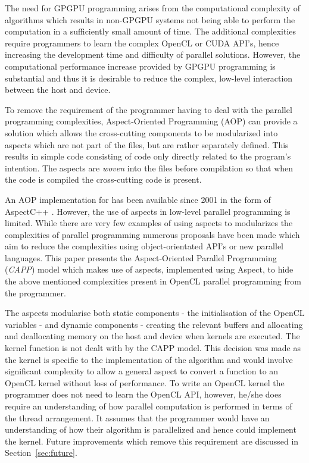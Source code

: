 \documentclass{sig-alternate-05-2015}
\begin{document}
The need for GPGPU programming arises from the computational complexity of
algorithms which results in non-GPGPU systems not being able to perform the
computation in a sufficiently small amount of time. The additional complexities
require programmers to learn the complex OpenCL or CUDA API's, hence increasing
the development time and difficulty of parallel solutions. However, the computational
performance increase
provided by GPGPU programming is substantial and thus it is desirable to reduce the complex, low-level
interaction between the host and device.

To remove the requirement of the programmer having to deal with the parallel
programming complexities, 
Aspect-Oriented Programming  (AOP) \cite{gregor:aop} can provide a solution which 
allows the cross-cutting components to be modularized into aspects which are not
part of the \CPP files, but are rather separately defined. This
results in simple \CPP code consisting of code only directly related to 
the program's intention. The aspects are \textit{woven} into the \CPP files before 
compilation so that when the code is compiled the cross-cutting code is present.

An AOP implementation for \CPP has been available  since 2001 in the form of AspectC++ 
\cite{gal:acppprop, olaf:app}. However, the use of aspects in low-level
parallel programming is limited. While there are very few examples of using
aspects to modularizes the complexities of parallel programming numerous proposals 
have been made which aim to reduce the complexities using object-orientated
API's or new parallel languages.  This paper presents the \CPP Aspect-Oriented Parallel
Programming (\textit{CAPP}) model which makes use of aspects, implemented using Aspect\CPP, to 
hide the above mentioned complexities present in OpenCL parallel programming 
from the programmer. 

The aspects modularise both static components - the initialisation of the
OpenCL variables - and dynamic components - creating the relevant buffers
and allocating and deallocating memory on the host and device when kernels are
executed. The kernel function is not dealt with by the CAPP model. This
decision was made as the kernel is specific to the implementation of the
algorithm and would involve significant complexity to allow a general aspect to
convert a \CPP function to an OpenCL kernel without loss of performance. To write 
an OpenCL kernel the programmer does not need to learn the OpenCL API, however,
he/she does require an understanding of how parallel computation is performed in terms of
the thread arrangement. It assumes that the programmer would have an
understanding of how their algorithm is parallelized and hence could implement
the kernel. Future improvements which remove this requirement are discussed in
Section~\ref{sec:future}.
\end{document}
